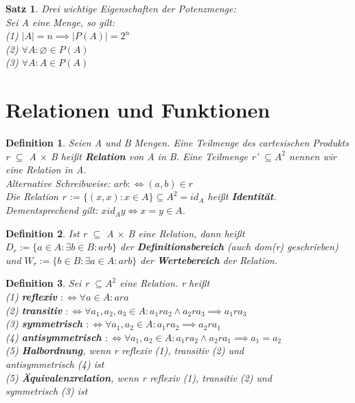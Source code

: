 \documentclass[12pt,german,a4]{article}
\begin{document}
\newtheorem{satz6}[satz]{Satz}
\begin{satz6}
Drei wichtige Eigenschaften der Potenzmenge:\\
Sei A eine Menge, so gilt:\\
(1) $|A| = n \implies |P(A)| = 2^{n}$\\
(2) $\forall A: \varnothing \in P(A)$\\
(3) $\forall A: A \in P(A)$
\end{satz6}

\pagebreak

\section{Relationen und Funktionen}

\newtheorem{defRel}{Definition}
\begin{defRel}
Seien A und B Mengen. Eine Teilmenge des cartesischen Produkts r $\subseteq$ A $\times$ B heißt {\bf Relation} von A in B. Eine Teilmenge r' $\subseteq A^{2}$ nennen wir eine Relation in A.\\
Alternative Schreibweise: $a r b :\Leftrightarrow (a, b) \in r$\\

Die Relation r := $\{(x, x) : x \in A\} \subseteq A^{2} = id_{A}$ heißt {\bf Identität}. Dementsprechend gilt: $x id_{A} y \Leftrightarrow x = y \in A$.
\end{defRel}

\newtheorem{defDom}[defRel]{Definition}
\begin{defDom}
Ist r $\subseteq$ A $\times$ B eine Relation, dann heißt $D_{r} := \{a \in A : \exists b \in B: a r b\}$ der {\bf Definitionsbereich} (auch dom(r) geschrieben) und $W_{r} := \{b \in B : \exists a \in A : a r b\}$ der {\bf Wertebereich} der Relation.
\end{defDom}

\newtheorem{defProps}[defRel]{Definition}
\begin{defProps}
Sei r $\subseteq A^{2}$ eine Relation. r heißt\\
(1) {\bf reflexiv} $:\Leftrightarrow \forall a \in A: a r a$\\
(2) {\bf transitiv} $:\Leftrightarrow \forall a_{1}, a_{2}, a_{3} \in A: a_{1} r a_{2} \wedge a_{2} r a_{3} \implies a_{1} r a_{3}$\\
(3) {\bf symmetrisch} $:\Leftrightarrow \forall a_{1}, a_{2} \in A: a_{1} r a_{2} \implies a_{2} r a_{1}$\\
(4) {\bf antisymmetrisch} $:\Leftrightarrow \forall a_{1}, a_{2} \in A: a_{1} r a_{2} \wedge  a_{2} r a_{1} \implies a_{1} = a_{2}$\\
(5) {\bf Halbordnung}, wenn r reflexiv (1), transitiv (2) und\\
\noindent\hspace*{6mm} antisymmetrisch (4) ist\\
(5) {\bf Äquivalenzrelation}, wenn r reflexiv (1), transitiv (2) und\\
\noindent\hspace*{6mm} symmetrisch (3) ist
\end{defProps}
\end{document}
